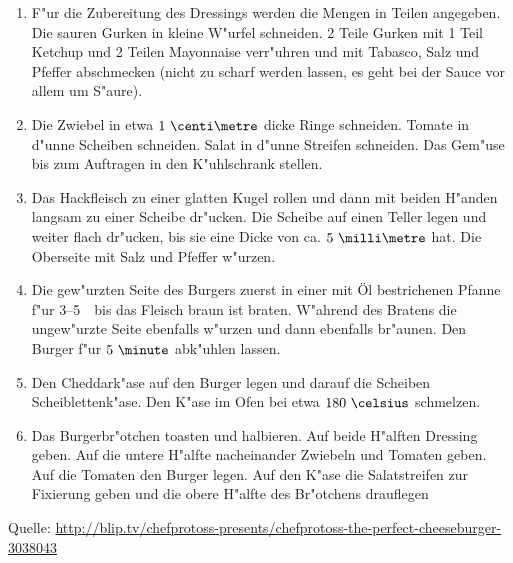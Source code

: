 \begin{enumerate}
\item	F"ur die Zubereitung des Dressings werden die Mengen in Teilen angegeben.
	Die sauren Gurken in kleine W"urfel schneiden.
	2 Teile Gurken mit 1 Teil Ketchup und 2 Teilen Mayonnaise verr"uhren und mit Tabasco, Salz und Pfeffer abschmecken (nicht zu scharf werden lassen, es geht bei der Sauce vor allem um S"aure).
\item	Die Zwiebel in etwa $1~\centi\metre$ dicke Ringe schneiden.
	Tomate in d"unne Scheiben schneiden.
	Salat in d"unne Streifen schneiden.
	Das Gem"use bis zum Auftragen in den K"uhlschrank stellen.
\item	Das Hackfleisch zu einer glatten Kugel rollen und dann mit beiden H"anden langsam zu einer Scheibe dr"ucken.
	Die Scheibe auf einen Teller legen und weiter flach dr"ucken, bis sie eine Dicke von ca. $5~\milli\metre$ hat.
	Die Oberseite mit Salz und Pfeffer w"urzen.
\item	Die gew"urzten Seite des Burgers zuerst in einer mit Öl bestrichenen Pfanne f"ur 3--5~\minute\ bis das Fleisch braun ist braten.
	W"ahrend des Bratens die ungew"urzte Seite ebenfalls w"urzen und dann ebenfalls br"aunen.
	Den Burger f"ur $5~\minute$ abk"uhlen lassen.
\item	Den Cheddark"ase auf den Burger legen und darauf die Scheiben Scheiblettenk"ase.
	Den K"ase im Ofen bei etwa $180~\celsius$ schmelzen.
\item	Das Burgerbr"otchen toasten und halbieren.
	Auf beide H"alften Dressing geben.
	Auf die untere H"alfte nacheinander Zwiebeln und Tomaten geben.
	Auf die Tomaten den Burger legen.
	Auf den K"ase die Salatstreifen zur Fixierung geben und die obere H"alfte des Br"otchens drauflegen
\end{enumerate}

Quelle: \url{http://blip.tv/chefprotoss-presents/chefprotoss-the-perfect-cheeseburger-3038043}
